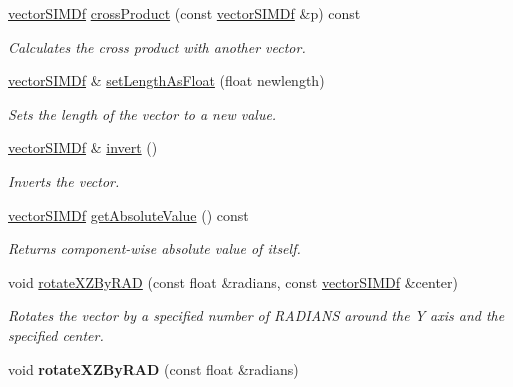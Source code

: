 \begin{DoxyCompactItemize}
\item 
\hyperlink{classirr_1_1core_1_1vectorSIMDf}{vector\+S\+I\+M\+Df} \hyperlink{classirr_1_1core_1_1vectorSIMDf_ad0fb87579c874dbb91030453c34f491b}{cross\+Product} (const \hyperlink{classirr_1_1core_1_1vectorSIMDf}{vector\+S\+I\+M\+Df} \&p) const 
\begin{DoxyCompactList}\small\item\em Calculates the cross product with another vector. \end{DoxyCompactList}\item 
\hyperlink{classirr_1_1core_1_1vectorSIMDf}{vector\+S\+I\+M\+Df} \& \hyperlink{classirr_1_1core_1_1vectorSIMDf_a6759e2eaaaf70f402eb4fd88206153b9}{set\+Length\+As\+Float} (float newlength)\hypertarget{classirr_1_1core_1_1vectorSIMDf_a6759e2eaaaf70f402eb4fd88206153b9}{}\label{classirr_1_1core_1_1vectorSIMDf_a6759e2eaaaf70f402eb4fd88206153b9}

\begin{DoxyCompactList}\small\item\em Sets the length of the vector to a new value. \end{DoxyCompactList}\item 
\hyperlink{classirr_1_1core_1_1vectorSIMDf}{vector\+S\+I\+M\+Df} \& \hyperlink{classirr_1_1core_1_1vectorSIMDf_ad8b248b451f76a8c51c1c92bbecb36a6}{invert} ()\hypertarget{classirr_1_1core_1_1vectorSIMDf_ad8b248b451f76a8c51c1c92bbecb36a6}{}\label{classirr_1_1core_1_1vectorSIMDf_ad8b248b451f76a8c51c1c92bbecb36a6}

\begin{DoxyCompactList}\small\item\em Inverts the vector. \end{DoxyCompactList}\item 
\hyperlink{classirr_1_1core_1_1vectorSIMDf}{vector\+S\+I\+M\+Df} \hyperlink{classirr_1_1core_1_1vectorSIMDf_a02d4f1440a0a47367224342839c9b3e0}{get\+Absolute\+Value} () const \hypertarget{classirr_1_1core_1_1vectorSIMDf_a02d4f1440a0a47367224342839c9b3e0}{}\label{classirr_1_1core_1_1vectorSIMDf_a02d4f1440a0a47367224342839c9b3e0}

\begin{DoxyCompactList}\small\item\em Returns component-\/wise absolute value of itself. \end{DoxyCompactList}\item 
void \hyperlink{classirr_1_1core_1_1vectorSIMDf_a09fa6616bea81293b371a125b0ff72c2}{rotate\+X\+Z\+By\+R\+AD} (const float \&radians, const \hyperlink{classirr_1_1core_1_1vectorSIMDf}{vector\+S\+I\+M\+Df} \&center)
\begin{DoxyCompactList}\small\item\em Rotates the vector by a specified number of R\+A\+D\+I\+A\+NS around the Y axis and the specified center. \end{DoxyCompactList}\item 
void {\bfseries rotate\+X\+Z\+By\+R\+AD} (const float \&radians)\hypertarget{classirr_1_1core_1_1vectorSIMDf_afa673a5e70af5f6af60312e0a01d6c0e}{}\label{classirr_1_1core_1_1vectorSIMDf_afa673a5e70af5f6af60312e0a01d6c0e}


\end{DoxyCompactItemize}
